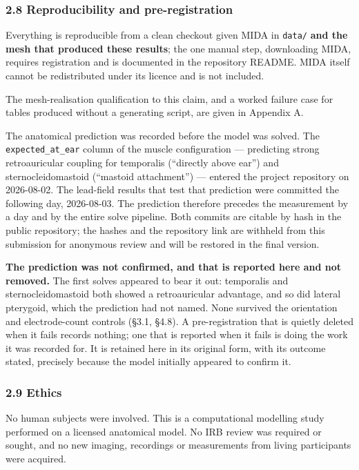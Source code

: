 \documentclass[manuscript,review,anonymous]{acmart}
\begin{document}
\subsubsection{2.8 Reproducibility and pre-registration}\label{reproducibility-and-pre-registration}

Everything is reproducible from a clean checkout given MIDA in \texttt{data/} \textbf{and the mesh that produced these results}; the one
manual step, downloading MIDA, requires registration and is documented in the
repository README. MIDA itself cannot be redistributed under its licence and is
not included.

The mesh-realisation qualification to this claim, and a worked failure case for tables produced without a generating script, are given in Appendix A.

The anatomical prediction was recorded before the model was solved. The
\texttt{expected\_at\_ear} column of the muscle configuration --- predicting strong
retroauricular coupling for temporalis (``directly above ear'') and
sternocleidomastoid (``mastoid attachment'') --- entered the project repository on
2026-08-02. The lead-field results that test that prediction were committed the
following day, 2026-08-03. The prediction therefore precedes the measurement by
a day and by the entire solve pipeline. Both commits are citable by hash in the
public repository; the hashes and the repository link are withheld from this
submission for anonymous review and will be restored in the final version.

\textbf{The prediction was not confirmed, and that is reported here and not removed.}
The first solves appeared to bear it out: temporalis and sternocleidomastoid
both showed a retroauricular advantage, and so did lateral pterygoid, which the
prediction had not named. None survived the orientation and electrode-count
controls (\S{}3.1, \S{}4.8). A pre-registration that is quietly deleted when it fails
records nothing; one that is reported when it fails is doing the work it was
recorded for. It is retained here in its original form, with its outcome stated,
precisely because the model initially appeared to confirm it.

\subsubsection{2.9 Ethics}\label{ethics}

No human subjects were involved. This is a computational modelling study
performed on a licensed anatomical model. No IRB review was required or sought,
and no new imaging, recordings or measurements from living participants were
acquired.
\end{document}

